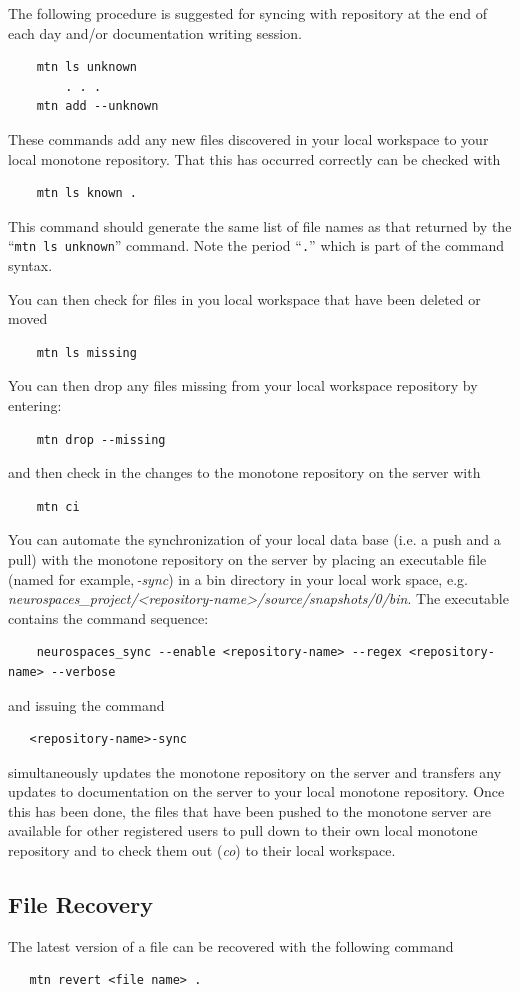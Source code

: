\documentclass[12pt]{article}
\begin{document}
The following procedure is suggested for syncing with repository at the end of each day and/or documentation writing session.

\begin{verbatim}
    mtn ls unknown
        . . .
    mtn add --unknown
\end{verbatim}
These commands add any new files discovered in your local workspace to your local monotone repository. That this has occurred correctly can be checked with
\begin{verbatim}
    mtn ls known .
\end{verbatim}
This command should generate the same list of file names as that returned by the ``{\tt mtn ls unknown}'' command. Note the period ``{\tt .}'' which is part of the command syntax.

You can then check for files in you local workspace that have been deleted or moved
\begin{verbatim}
    mtn ls missing
\end{verbatim}
You can then drop any files missing from your local workspace repository by entering:
\begin{verbatim}
    mtn drop --missing
\end{verbatim}
and then check in the changes to the monotone repository on the server with
\begin{verbatim}
    mtn ci
\end{verbatim}
You can automate the synchronization of your local data base (i.e. a push and a pull) with the monotone repository on the server by placing an executable file (named for example,\,{\it <repository-name>-sync}) in a bin directory in your local work space, e.g. {\it neurospaces\_project/<repository-name>/source/snapshots/0/bin}. 
The executable contains the command sequence:
\begin{verbatim}
    neurospaces_sync --enable <repository-name> --regex <repository-name> --verbose
\end{verbatim}
and issuing the command
\begin{verbatim}
   <repository-name>-sync
\end{verbatim}
simultaneously updates the monotone repository on the server and transfers any updates to documentation on the server to your local monotone repository. Once this has been done, the files that have been pushed to the monotone server are available for other registered users to pull down to their own local monotone repository and to check them out ({\it co}) to their local workspace.

\subsection*{File Recovery}

The latest version of a file can be recovered with the following command
\begin{verbatim}
   mtn revert <file name> .
\end{verbatim}
\end{document}
